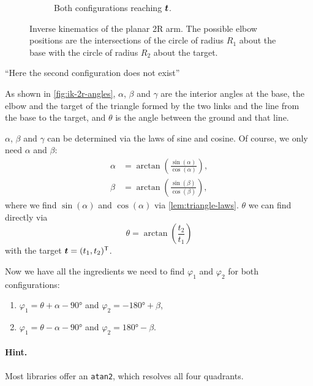 \begin{figure}[tbp]
\begin{subfigure}[b]{0.48\textwidth}
    \caption{Both configurations reaching $\bm{t}$.}
    \label{fig:ik-2r-configs}
  \end{subfigure}
  \caption{Inverse kinematics of the planar 2R arm. The possible elbow
    positions are the intersections of the circle of radius $R_1$ about
    the base with the circle of radius $R_2$ about the target.}
  \label{fig:ik-2r}
\end{figure}

\enquote{Here the second configuration does not exist}

As shown in \cref{fig:ik-2r-angles}, $\alpha$, $\beta$ and $\gamma$ are the
interior angles at the base, the elbow and the target of the triangle
formed by the two links and the line from the base to the target, and
$\theta$ is the angle between the ground and that line.

$\alpha$, $\beta$ and $\gamma$ can be determined via the laws of sine and
cosine. Of course, we only need $\alpha$ and $\beta$:
\begin{align*}
  \alpha &= \arctan\left(\frac{\sin(\alpha)}{\cos(\alpha)}\right), \\
  \beta  &= \arctan\left(\frac{\sin(\beta)}{\cos(\beta)}\right),
\end{align*}
where we find $\sin(\alpha)$ and $\cos(\alpha)$ via
\cref{lem:triangle-laws}. $\theta$ we can find directly via
\[
  \theta = \arctan\left(\frac{t_2}{t_1}\right)
\]
with the target $\bm{t} = (t_1, t_2)^{\mathsf{T}}$.

Now we have all the ingredients we need to find $\varphi_1$ and
$\varphi_2$ for both configurations:
\begin{enumerate}
  \item $\varphi_1 = \theta + \alpha - \ang{90}$ \quad and \quad
        $\varphi_2 = -\ang{180} + \beta$,
  \item $\varphi_1 = \theta - \alpha - \ang{90}$ \quad and \quad
        $\varphi_2 = \ang{180} - \beta$.
\end{enumerate}

\paragraph{Hint.}
Most libraries offer an \texttt{atan2}, which resolves all four quadrants.

